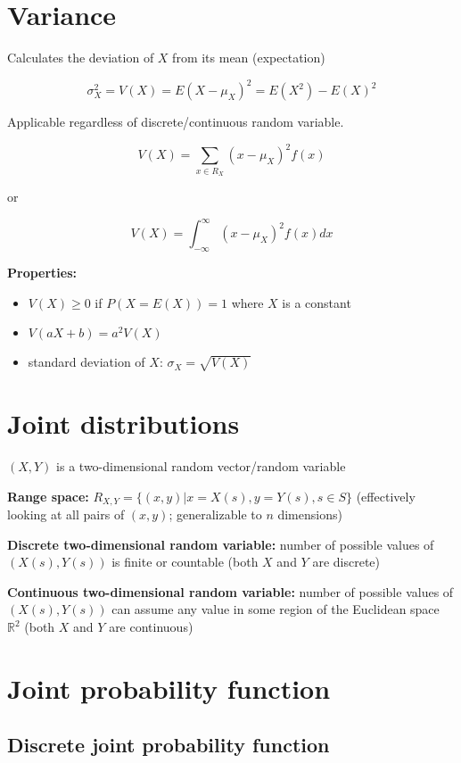 \documentclass[twocolumn, 8pt]{extarticle}
\begin{document}
\section*{Variance}

Calculates the deviation of $X$ from its mean (expectation)

$$
\sigma_X^2 = V(X) = E(X - \mu_X)^2 = E(X^2) - E(X)^2
$$

Applicable regardless of discrete/continuous random variable.

$$
V(X) = \sum_{x \in R_X} (x - \mu_X)^2 f(x)
$$

or 

$$
V(X) = \int_{-\infty}^{\infty} (x - \mu_X)^2 f(x) dx
$$

\textbf{Properties:}

\begin{itemize}
    \item $V(X) \geq 0$ if $P(X = E(X)) = 1$ where $X$ is a constant
    \item $V(aX + b) = a^2 V(X)$
    \item standard deviation of $X$: $\sigma_X = \sqrt{V(X)}$
\end{itemize}

\section*{Joint distributions}

$(X, Y)$ is a two-dimensional random vector/random variable

\textbf{Range space:} $R_{X, Y} = \{(x, y) | x = X(s), y = Y(s), s \in S\}$ (effectively looking at all pairs of $(x, y)$; generalizable to $n$ dimensions) 

\textbf{Discrete two-dimensional random variable:} number of possible values of $(X(s), Y(s))$ is finite or countable (both $X$ and $Y$ are discrete)

\textbf{Continuous two-dimensional random variable:} number of possible values of $(X(s), Y(s))$ can assume any value in some region of the Euclidean space $\mathbb{R}^2$ (both $X$ and $Y$ are continuous)

\section*{Joint probability function}

\subsection*{Discrete joint probability function}
\end{document}
